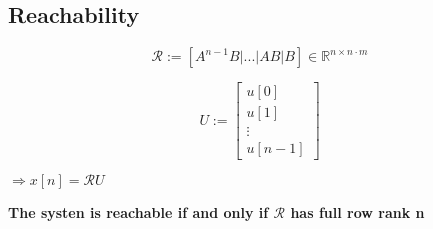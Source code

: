 \subsection{Reachability}
    \begin{minipage}{0.63\linewidth}
        $$
        \mathcal{R} := \left[A^{n-1}B | ... | AB | B \right] \in \mathbb{R}^{n\times n \cdot m}
        $$
    \end{minipage}
    \begin{minipage}{0.36\linewidth}
        $$
            U :=
            \begin{bmatrix}
                u[0] \\
                u[1] \\
                \vdots \\
                u[n -1]
            \end{bmatrix}
        $$
    \end{minipage}

    $\Rightarrow x[n] = \mathcal{R}U$
    \vspace{5pt}

    \textbf{The systen is reachable if and only if $\mathcal{R}$ has full row rank n}